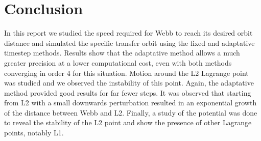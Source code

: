 \section{Conclusion}

In this report we studied the speed required for Webb to reach its desired orbit distance and simulated the specific transfer orbit using the fixed and adaptative timestep methods. Results show that the adaptative method allows a much greater precision at a lower computational cost, even with both methods converging in order 4 for this situation. Motion around the L2 Lagrange point was studied and we observed the instability of this point. Again, the adaptative method provided good results for far fewer steps. It was observed that starting from L2 with a small downwards perturbation resulted in an exponential growth of the distance between Webb and L2. Finally, a study of the potential was done to reveal the stability of the L2 point and show the presence of other Lagrange points, notably L1.